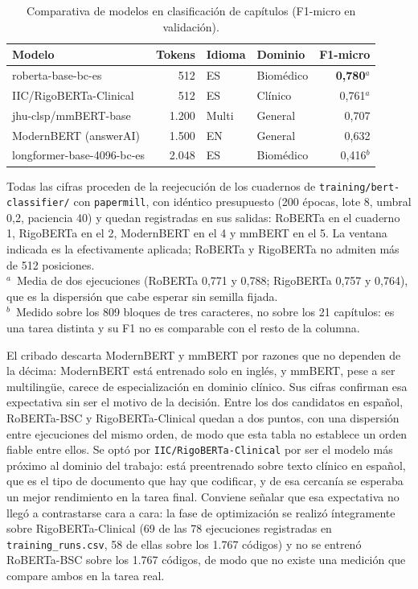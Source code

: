 \begin{table}[ht]
\centering
\small
\caption[Comparativa de modelos en clasificación de capítulos (F1-micro en validación)]{Comparativa de modelos en clasificación de capítulos (F1-micro en validación). }
\label{tab:modelos-capitulos}
\begin{tabular}{P{5.5cm}rllr}
\hline
\textbf{Modelo} & \textbf{Tokens} & \textbf{Idioma} & \textbf{Dominio} & \textbf{F1-micro} \\
\hline
roberta-base-bc-es & 512 & ES & Biomédico & \textbf{0,780}$^{a}$ \\
IIC/RigoBERTa-Clinical & 512 & ES & Clínico & 0,761$^{a}$ \\
jhu-clsp/mmBERT-base & 1.200 & Multi & General & 0,707 \\
ModernBERT (answerAI) & 1.500 & EN & General & 0,632 \\
longformer-base-4096-bc-es & 2.048 & ES & Biomédico & 0,416$^{b}$ \\
\hline
\end{tabular}

\smallskip\footnotesize Todas las cifras proceden de la reejecución de los cuadernos de \texttt{training/bert-classifier/} con \texttt{papermill}, con idéntico presupuesto (200 épocas, lote 8, umbral 0,2, paciencia 40) y quedan registradas en sus salidas: RoBERTa en el cuaderno 1, RigoBERTa en el 2, ModernBERT en el 4 y mmBERT en el 5. La ventana indicada es la efectivamente aplicada; RoBERTa y RigoBERTa no admiten más de 512 posiciones. \\$^{a}$~Media de dos ejecuciones (RoBERTa 0,771 y 0,788; RigoBERTa 0,757 y 0,764), que es la dispersión que cabe esperar sin semilla fijada. \\$^{b}$~Medido sobre los 809 bloques de tres caracteres, no sobre los 21 capítulos: es una tarea distinta y su F1 no es comparable con el resto de la columna.

\end{table}

El cribado descarta ModernBERT y mmBERT por razones que no dependen de la décima: ModernBERT está entrenado solo en inglés, y mmBERT, pese a ser multilingüe, carece de especialización en dominio clínico. Sus cifras confirman esa expectativa sin ser el motivo de la decisión. Entre los dos candidatos en español, RoBERTa-BSC y RigoBERTa-Clinical quedan a dos puntos, con una dispersión entre ejecuciones del mismo orden, de modo que esta tabla no establece un orden fiable entre ellos. Se optó por \texttt{IIC/RigoBERTa-Clinical} por ser el modelo más próximo al dominio del trabajo: está preentrenado sobre texto clínico en español, que es el tipo de documento que hay que codificar, y de esa cercanía se esperaba un mejor rendimiento en la tarea final. Conviene señalar que esa expectativa no llegó a contrastarse cara a cara: la fase de optimización se realizó íntegramente sobre RigoBERTa-Clinical (69 de las 78 ejecuciones registradas en \texttt{training\_runs.csv}, 58 de ellas sobre los 1.767 códigos) y no se entrenó RoBERTa-BSC sobre los 1.767 códigos, de modo que no existe una medición que compare ambos en la tarea real.

